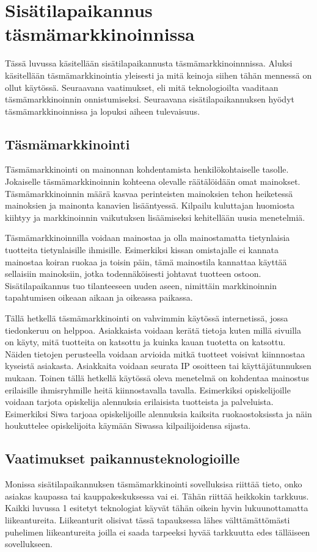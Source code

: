 \section{Sisätilapaikannus täsmämarkkinoinnissa}
Tässä luvussa käsitellään sisätilapaikannusta täsmämarkkinoinnnissa. Aluksi käsitellään täsmämarkkinointia yleisesti ja mitä keinoja siihen tähän mennessä on ollut käytössä. Seuraavana vaatimukset, eli mitä teknologioilta vaaditaan täsmämarkkinoinnin onnistumiseksi. Seuraavana sisätilapaikannuksen hyödyt täsmämarkkinoinnissa ja lopuksi aiheen tulevaisuus.
\subsection{Täsmämarkkinointi}
Täsmämarkkinointi on mainonnan kohdentamista henkilökohtaiselle tasolle. Jokaiselle täsmämarkkinoinnin kohteena olevalle räätälöidään omat mainokset. Täsmämarkkinoinnin määrä kasvaa perinteisten mainoksien tehon heiketessä mainoksien ja mainonta kanavien lisääntyessä\cite{tasma}. Kilpailu kuluttajan huomiosta kiihtyy ja markkinoinnin vaikutuksen lisäämiseksi kehitellään uusia menetelmiä.

Täsmämarkkinoinnilla voidaan mainostaa ja olla mainostamatta tietynlaisia tuotteita tietynlaisille ihmisille. Esimerkiksi kissan omistajalle ei kannata mainostaa koiran ruokaa ja toisin päin\cite{tasma}, tämä mainostila kannattaa käyttää sellaisiin mainoksiin, jotka todennäköisesti johtavat tuotteen ostoon. Sisätilapaikannus tuo tilanteeseen uuden aseen, nimittäin markkinoinnin tapahtumisen oikeaan aikaan ja oikeassa paikassa.

Tällä hetkellä täsmämarkkinointi on vahvimmin käytössä internetissä, jossa tiedonkeruu on helppoa. Asiakkaista voidaan kerätä tietoja kuten millä sivuilla on käyty, mitä tuotteita on katsottu ja kuinka kauan tuotetta on katsottu. Näiden tietojen perusteella voidaan arvioida mitkä tuotteet voisivat kiinnnostaa kyseistä asiakasta. Asiakkaita voidaan seurata IP osoitteen tai käyttäjätunnuksen mukaan.
Toinen tällä hetkellä käytössä oleva menetelmä on kohdentaa mainostus erilaisille ihmisryhmille heitä kiinnostavalla tavalla. Esimerkiksi opiskelijoille voidaan tarjota opiskelija alennuksia erilaisista tuotteista ja palveluista. Esimerkiksi Siwa tarjoaa opiskelijoille alennuksia kaiksita ruokaostoksissta\cite{siwa} ja näin houkuttelee opiskelijoita käymään Siwassa kilpailijoidensa sijasta. 

\subsection{Vaatimukset paikannusteknologioille}
Monissa sisätilapaikannuksen täsmämarkkinointi sovelluksisa riittää tieto, onko asiakas kaupassa tai kauppakeskuksessa vai ei. Tähän riittää heikkokin tarkkuus. Kaikki luvussa 1 esitetyt teknologiat käyvät tähän oikein hyvin lukuunottamatta liikeantureita. Liikeanturit olisivat tässä tapauksessa lähes välttämättömästi puhelimen liikeantureita joilla ei saada tarpeeksi hyvää tarkkuutta edes tälläiseen sovellukseen.
